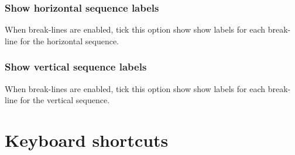 \documentclass{report}
\begin{document}
\bigskip

{\color[rgb]{0.30980393,0.5058824,0.7411765}\subsubsection[Show horizontal sequence labels]{Show horizontal sequence labels}}
{When break-lines are enabled, tick this option show show labels for each
break-line for the horizontal sequence.}

\bigskip

{\color[rgb]{0.30980393,0.5058824,0.7411765}\subsubsection[Show vertical sequence labels]{Show vertical sequence labels}}
{When break-lines are enabled, tick this option show show labels for each
break-line for the vertical sequence.}

\bigskip

{\color[rgb]{0.0,0.27058825,0.5254902}\section[Keyboard shortcuts]{Keyboard shortcuts}}
\end{document}
